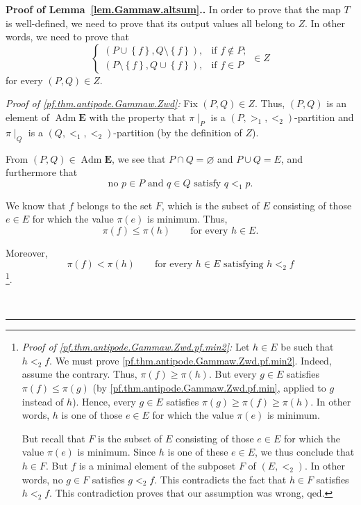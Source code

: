 \documentclass[numbers=enddot,12pt,final,onecolumn,notitlepage,abstracton]{scrartcl}%
\theoremstyle{definition}
\newenvironment{proof}[1][Proof]{\noindent\textbf{#1.} }{\ \rule{0.5em}{0.5em}}
\newcommand{\Adm}{\operatorname{Adm}}
\newcommand{\EE}{{\mathbf{E}}}
\begin{document}
\begin{proof}[Proof of Lemma~\ref{lem.Gammaw.altsum}.]
In order to prove that the map $T$ is well-defined, we need to prove that its
output values all belong to $Z$. In other words, we need to prove that
\begin{equation}
\begin{cases}
\left(  P\cup\left\{  f\right\}  ,Q\setminus\left\{  f\right\}  \right)  , &
\text{if }f\notin P;\\
\left(  P\setminus\left\{  f\right\}  ,Q\cup\left\{  f\right\}  \right)  , &
\text{if }f\in P
\end{cases}
\in Z
\label{pf.thm.antipode.Gammaw.Zwd}
\end{equation}
for every $\left(  P,Q\right)  \in Z$.

\textit{Proof of \eqref{pf.thm.antipode.Gammaw.Zwd}:} Fix $\left(  P,Q\right)
\in Z$. Thus, $\left(  P,Q\right)  $ is an element of
$ \Adm \EE$ with the property that
$\pi\mid_{P}$ is a $\left(  P,>_{1},<_{2}\right)  $-partition
and $\pi\mid_{Q}$ is a $\left(  Q,<_{1},<_{2}\right)  $-partition
(by the definition of $Z$).

From $\left(  P,Q\right)  \in \Adm \EE$, we see that
$P\cap Q=\varnothing$ and $P\cup Q=E$, and furthermore that
\begin{equation}
\text{no }p\in P\text{ and }q\in Q\text{ satisfy }q<_{1}
p.
\label{pf.thm.antipode.Gammaw.Zwd.pf.Adm}
\end{equation}

We know that $f$ belongs to the set $F$, which is the subset of $E$ consisting
of those $e\in E$ for which the value $\pi \left( e \right)$
is minimum. Thus,
\begin{equation}
\pi\left(  f\right)  \leq\pi\left(  h\right)  \qquad\text{for every }h\in
E.
\label{pf.thm.antipode.Gammaw.Zwd.pf.min}
\end{equation}


Moreover,
\begin{equation}
\pi\left(  f\right)  <\pi\left(  h\right)
\qquad\text{for every } h\in E \text{ satisfying } h<_{2}f
\label{pf.thm.antipode.Gammaw.Zwd.pf.min2}
\end{equation}
\footnote{\textit{Proof of \eqref{pf.thm.antipode.Gammaw.Zwd.pf.min2}:} Let
$h\in E$ be such that $h<_{2}f$. We must prove
\eqref{pf.thm.antipode.Gammaw.Zwd.pf.min2}. Indeed, assume the contrary. Thus,
$\pi \left( f \right) \geq \pi \left( h \right)$.
But every $g \in E$ satisfies
$\pi \left( f \right) \leq \pi \left( g \right)$
(by \eqref{pf.thm.antipode.Gammaw.Zwd.pf.min}, applied to
$g$ instead of $h$). Hence, every $g \in E$ satisfies
$\pi \left( g \right) \geq \pi \left( f \right)
\geq \pi \left( h \right)$. In other words,
$h$ is one of those $e\in E$ for which the value
$\pi \left( e \right)$ is minimum.
\par
But recall that $F$ is the subset of $E$ consisting
of those $e\in E$ for which the value $\pi \left( e \right)$
is minimum. Since $h$ is one of these $e\in E$,
we thus conclude that $h \in F$.
But $f$ is a minimal element
of the subposet $F$ of $\left(E, <_2\right)$.
In other words, no $g\in F$ satisfies $g<_{2}f$. This contradicts the
fact that $h\in F$ satisfies $h<_{2}f$. This contradiction proves that our
assumption was wrong, qed.}.


\end{proof}
\end{document}
